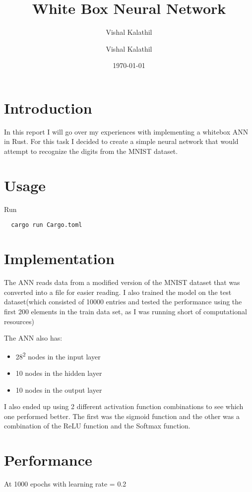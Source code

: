 \documentclass[a4paper]{article}
\author{Vishal Kalathil}
\author{Vishal Kalathil}
\date{\today}
\title{White Box Neural Network}
\begin{document}
\maketitle
\tableofcontents



\section{Introduction}
\label{sec:orgb0af926}
In this report I will go over my experiences with implementing a whitebox ANN in Rust.
For this task I decided to create a simple neural network that would attempt to recognize the digits from the MNIST dataset.

\section{Usage}
\label{sec:org537ea94}
Run
\begin{verbatim}
  cargo run Cargo.toml
\end{verbatim}

\section{Implementation}
\label{sec:org3f5f05f}
The ANN reads data from a modified version of the MNIST dataset that was converted into a file for easier reading. I also trained the model on the test dataset(which consisted of 10000 entries and tested the performance using the first 200 elements in the train data set, as I was running short of computational resources)

The ANN also has:
\begin{itemize}
\item 28\textsuperscript{2} nodes in the input layer
\item 10 nodes in the hidden layer
\item 10 nodes in the output layer
\end{itemize}
I also ended up using 2 different activation function combinations to see which one performed better.
The first was the sigmoid function and the other was a combination of the ReLU function and the Softmax function.

\section{Performance}
\label{sec:org24f1928}
At 1000 epochs with learning rate = 0.2
\end{document}
